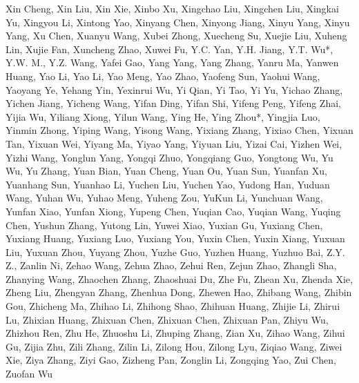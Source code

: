 Xin Cheng, Xin Liu, Xin Xie, Xinbo Xu, Xingchao Liu, Xingchen Liu,
Xingkai Yu, Xingyou Li, Xintong Yao, Xinyang Chen, Xinyong Jiang, Xinyu
Yang, Xinyu Yang, Xu Chen, Xuanyu Wang, Xubei Zhong, Xuecheng Su, Xuejie
Liu, Xuheng Lin, Xujie Fan, Xuncheng Zhao, Xuwei Fu, Y.C. Yan, Y.H.
Jiang, Y.T. Wu*, Y.W. M., Y.Z. Wang, Yafei Gao, Yang Yang, Yang Zhang,
Yanru Ma, Yanwen Huang, Yao Li, Yao Li, Yao Meng, Yao Zhao, Yaofeng Sun,
Yaohui Wang, Yaoyang Ye, Yehang Yin, Yexinrui Wu, Yi Qian, Yi Tao, Yi
Yu, Yichao Zhang, Yichen Jiang, Yicheng Wang, Yifan Ding, Yifan Shi,
Yifeng Peng, Yifeng Zhai, Yijia Wu, Yiliang Xiong, Yilun Wang, Ying He,
Ying Zhou*, Yingjia Luo, Yinmin Zhong, Yiping Wang, Yisong Wang, Yixiang
Zhang, Yixiao Chen, Yixuan Tan, Yixuan Wei, Yiyang Ma, Yiyao Yang,
Yiyuan Liu, Yizai Cai, Yizhen Wei, Yizhi Wang, Yonglun Yang, Yongqi
Zhuo, Yongqiang Guo, Yongtong Wu, Yu Wu, Yu Zhang, Yuan Bian, Yuan
Cheng, Yuan Ou, Yuan Sun, Yuanfan Xu, Yuanhang Sun, Yuanhao Li, Yuchen
Liu, Yuchen Yao, Yudong Han, Yuduan Wang, Yuhan Wu, Yuhao Meng, Yuheng
Zou, YuKun Li, Yunchuan Wang, Yunfan Xiao, Yunfan Xiong, Yupeng Chen,
Yuqian Cao, Yuqian Wang, Yuqing Chen, Yushun Zhang, Yutong Lin, Yuwei
Xiao, Yuxian Gu, Yuxiang Chen, Yuxiang Huang, Yuxiang Luo, Yuxiang You,
Yuxin Chen, Yuxin Xiang, Yuxuan Liu, Yuxuan Zhou, Yuyang Zhou, Yuzhe
Guo, Yuzhen Huang, Yuzhuo Bai, Z.Y. Z., Zanlin Ni, Zehao Wang, Zehua
Zhao, Zehui Ren, Zejun Zhao, Zhangli Sha, Zhanying Wang, Zhaochen Zhang,
Zhaoshuai Du, Zhe Fu, Zhean Xu, Zhenda Xie, Zheng Liu, Zhengyan Zhang,
Zhenhua Dong, Zhewen Hao, Zhibang Wang, Zhibin Gou, Zhicheng Ma, Zhihao
Li, Zhihong Shao, Zhihuan Huang, Zhijie Li, Zhirui Lu, Zhixian Huang,
Zhixuan Chen, Zhixuan Chen, Zhixuan Pan, Zhiyu Wu, Zhizhou Ren, Zhu He,
Zhuoshu Li, Zhuping Zhang, Zian Xu, Zihao Wang, Zihui Gu, Zijia Zhu,
Zili Zhang, Zilin Li, Zilong Hou, Zilong Lyu, Ziqiao Wang, Ziwei Xie,
Ziya Zhang, Ziyi Gao, Zizheng Pan, Zonglin Li, Zongqing Yao, Zui Chen,
Zuofan Wu

